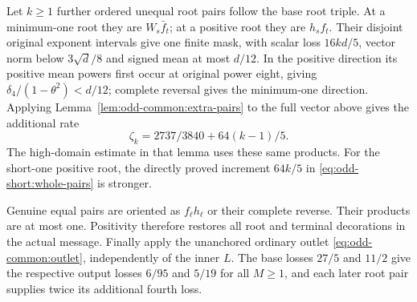 Let $k\ge1$ further ordered unequal root pairs follow the base
root triple. At a minimum-one root they are $W_s\bar f_t$;
at a positive root they are $h_sf_t$.
Their disjoint original exponent intervals give one finite mask,
with scalar loss $16kd/5$, vector norm below $3\sqrt d/8$ and
signed mean at most $d/12$. In the positive direction its positive
mean powers first occur at original power eight, giving
$\delta_4/(1-\theta^2)<d/12$; complete reversal gives the
minimum-one direction. Applying
Lemma~\ref{lem:odd-common:extra-pairs} to the full vector above
gives the additional rate
\begin{equation}\label{eq:odd-complete:later-rate}
 \zeta_k=2737/3840+64(k-1)/5.
\end{equation}
The high-domain estimate in that lemma uses these same products.
For the short-one positive root, the directly proved increment
$64k/5$ in \eqref{eq:odd-short:whole-pairs} is stronger.

Genuine equal pairs are oriented as $f_\ell h_\ell$ or their
complete reverse. Their products are at most one. Positivity
therefore restores all root and terminal decorations in the
actual message. Finally apply the unanchored ordinary outlet
\eqref{eq:odd-common:outlet}, independently of the inner $L$.
The base losses $27/5$ and $11/2$ give the respective output
losses $6/95$ and $5/19$ for all $M\ge1$, and each later root
pair supplies twice its additional fourth loss.
